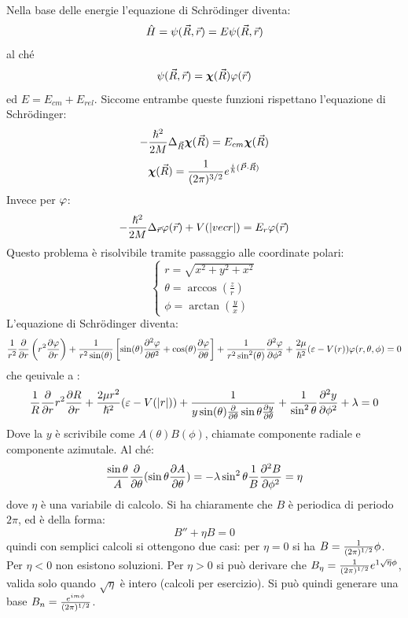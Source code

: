 Nella base delle energie l'equazione di Schrödinger diventa:
\[
    \H = \psi(\vec R, \vec r) = E \psi(\vec R, \vec r)
\]
al ché
\[
    \psi(\vec R, \vec r) = \CHI(\vec R) \vphi(\vec r)
\]
ed $E = E_{cm} + E_{rel}$. Siccome entrambe queste funzioni rispettano l'equazione di Schrödinger:
\[
    -\frac{\hslash^2}{2M} \Lap_{\vec R} \CHI(\vec R) = E_{cm} \CHI(\vec R) \]\[
    \CHI(\vec R) = \fourierconst[3] e^{\frac{i}{\hslash}(\vec P \cdot \vec R)}
\]
Invece per $\vphi$:
\[
    -\frac{\hslash^2}{2M} \Lap_{\vec r} \vphi(\vec r) + V(|vec r|) = E_{r} \vphi(\vec r)
\]
Questo problema è risolvibile tramite passaggio alle coordinate polari:
\[
    \begin{cases}
        r = \sqrt{x^2 + y^2 + x^2} \\
        \theta = \arccos (\frac{z}{r}) \\
        \phi = \arctan (\frac{y}{x})
    \end{cases}
\]
L'equazione di Schrödinger diventa:
\[
    \frac{1}{r^2} \deriv[r]{} \l r^2 \deriv[r]{\vphi} \r + \frac{1}{r^2 \sin(\theta)}\left[ \sin (\theta) \sderiv[\theta]{\vphi} + \cos (\theta) \deriv[\theta] {\vphi} \right] + \frac{1}{r^2 \sin^2(\theta)} \sderiv[\phi]{\vphi} + \frac{2 \mu}{\hslash^2}(\varepsilon - V(r))\vphi(r,\theta,\phi) = 0
\]
che qeuivale a :
\[
    \frac{1}{R}\deriv[r]{}r^2 \deriv[r]{R} + \frac{2\mu r^2}{\hslash^2}(\varepsilon - V(|r|)) + \frac{1}{y \sin (\theta) \deriv[\theta]{} \sin\theta \deriv[\theta]{y}} + \frac{1}{\sin^2 \theta} \sderiv[\phi]{y} + \lambda = 0
\]
Dove la $y$ è scrivibile come $A(\theta) B(\phi)$, chiamate componente radiale e componente azimutale. Al ché:
\[
\frac{\sin \theta}{A}\deriv[\theta]{}(\sin\theta \deriv[\theta]{A}) = - \lambda \sin^2 \theta \frac{1}{B} \sderiv[\phi]{B} = \eta
\]
dove $\eta$ è una variabile di calcolo. Si ha chiaramente che $B$ è periodica di periodo $2\pi$, ed è della forma:
\[
B'' + \eta B = 0
\]
quindi con semplici calcoli si ottengono due casi: per $\eta = 0$ si ha $B = \fourierconst[1] \phi$. Per $\eta < 0$ non esistono soluzioni. Per $\eta > 0$ si può derivare che $B_\eta = \fourierconst[1] e^{1\sqrt \eta \phi}$, valida solo quando $\sqrt \eta$ è intero (calcoli per esercizio). Si può quindi generare una base $B_n = \frac{e^{im\phi}}{\fourierconstinv[1]}$.

